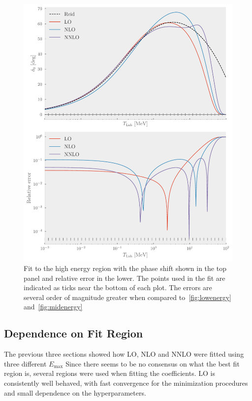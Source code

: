 \begin{figure}[pt]
  \centering
  \includegraphics{Figures/highenergy.pdf}
  \caption{\label{fig:highenergy}Fit to the high energy region with the phase
    shift shown in the top panel and relative error in the lower. The points
    used in the fit are indicated as ticks near the bottom of each plot. The
    errors are several order of magnitude greater when compared
    to~\cref{fig:lowenergy} and~\cref{fig:midenergy}}
\end{figure}

\subsection{Dependence on Fit Region}

The previous three sections showed how LO, NLO and NNLO were fitted using
three different \(E_{\mathrm{max}}\) 
Since there seems to be no consensus on what the best fit region is, several
regions were used when fitting the coefficients. LO  is consistently well
behaved, with fast convergence for the minimization procedures and small
dependence on the hyperparameters.

